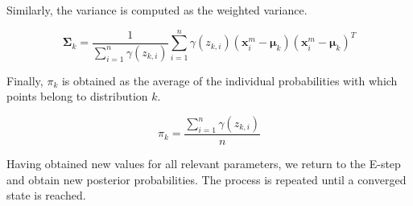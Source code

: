 Similarly, the variance is computed as the weighted variance.

\begin{equation}\label{eq:mm_var}
    \bm{\Sigma}_k = \frac{1}{\sum^n_{i=1} \gamma(z_{k,i})} \sum^n_{i=1} \gamma(z_{k,i}) (\textbf{x}^m_i-\bm{\mu}_k)(\textbf{x}^m_i-\bm{\mu}_k)^T
\end{equation}

Finally, $\pi_k$ is obtained as the average of the individual probabilities with which points belong to distribution $k$.

\begin{equation}\label{eq:mm_mix}
    \pi_k = \frac{\sum^n_{i=1}{} \gamma(z_{k,i})}{n}
\end{equation}

Having obtained new values for all relevant parameters, we return to the E-step and obtain new posterior probabilities. The process is repeated until a converged state is reached.\\
